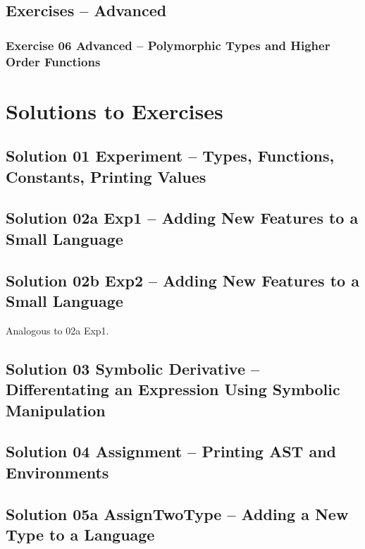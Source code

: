 \documentclass[10.5pt,a4]{article}
\begin{document}
\subsection{Exercises – Advanced}
\subsubsection{Exercise 06 Advanced – Polymorphic Types and Higher Order Functions}

\lstset{language=modelica}

\section{Solutions to Exercises}

\subsection{Solution 01 Experiment – Types, Functions, Constants, Printing Values}


\subsection{Solution 02a Exp1 –  Adding New Features to a Small Language}


\subsection{Solution 02b Exp2 –  Adding New Features to a Small Language}
Analogous to 02a Exp1.

\subsection{Solution 03 Symbolic Derivative –  Differentating an Expression Using Symbolic Manipulation}


\subsection{Solution 04 Assignment – Printing AST and Environments}


\subsection{Solution 05a AssignTwoType – Adding a New Type to a Language}

\end{document}
